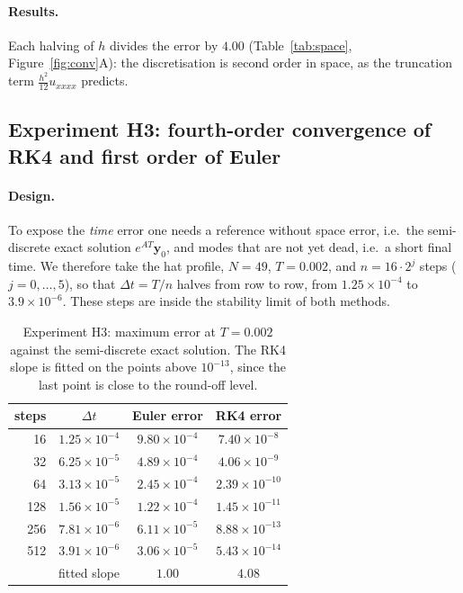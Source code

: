 \documentclass[11pt,a4paper]{article}
\newcommand{\Dt}{\Delta t}
\newcommand{\bfy}{\mathbf{y}}
\begin{document}
\paragraph{Results.} Each halving of $h$ divides the error by $4.00$ (Table~\ref{tab:space},
Figure~\ref{fig:conv}A): the discretisation is second order in space, as the truncation term
$\tfrac{h^2}{12}u_{xxxx}$ predicts.

\subsection{Experiment H3: fourth-order convergence of RK4 and first order of Euler}

\paragraph{Design.} To expose the \emph{time} error one needs a reference without space error, i.e.\
the semi-discrete exact solution $e^{AT}\bfy_0$, and modes that are not yet dead, i.e.\ a short final time.
We therefore take the hat profile, $N=49$, $T=0.002$, and $n=16\cdot2^j$ steps ($j=0,\dots,5$), so that
$\Dt=T/n$ halves from row to row, from $1.25\times10^{-4}$ to $3.9\times10^{-6}$. These steps are
inside the stability limit of both methods.

\begin{table}[H]
\centering
\begin{tabular}{@{}rccc@{}}
\toprule
steps & $\Dt$ & Euler error & RK4 error\\
\midrule
16 & $1.25\times10^{-4}$ & $9.80\times10^{-4}$ & $7.40\times10^{-8}$\\
32 & $6.25\times10^{-5}$ & $4.89\times10^{-4}$ & $4.06\times10^{-9}$\\
64 & $3.13\times10^{-5}$ & $2.45\times10^{-4}$ & $2.39\times10^{-10}$\\
128 & $1.56\times10^{-5}$ & $1.22\times10^{-4}$ & $1.45\times10^{-11}$\\
256 & $7.81\times10^{-6}$ & $6.11\times10^{-5}$ & $8.88\times10^{-13}$\\
512 & $3.91\times10^{-6}$ & $3.06\times10^{-5}$ & $5.43\times10^{-14}$\\
\midrule
\multicolumn{2}{r}{fitted slope} & $1.00$ & $4.08$\\
\bottomrule
\end{tabular}
\caption{Experiment H3: maximum error at $T=0.002$ against the semi-discrete exact solution. The RK4
slope is fitted on the points above $10^{-13}$, since the last point is close to the round-off level.}
\label{tab:time}
\end{table}
\end{document}
